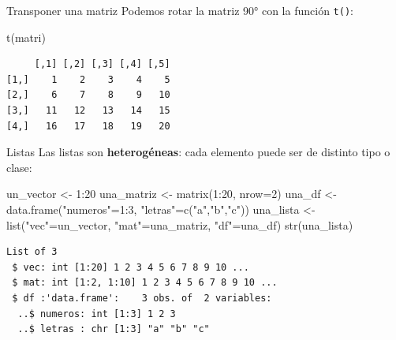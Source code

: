 \documentclass[
  9pt,
  ignorenonframetext,
]{beamer}
\newenvironment{Shaded}{\begin{snugshade}}{\end{snugshade}}
\newcommand{\AttributeTok}[1]{\textcolor[rgb]{0.40,0.45,0.13}{#1}}
\newcommand{\DecValTok}[1]{\textcolor[rgb]{0.68,0.00,0.00}{#1}}
\newcommand{\FunctionTok}[1]{\textcolor[rgb]{0.28,0.35,0.67}{#1}}
\newcommand{\NormalTok}[1]{\textcolor[rgb]{0.00,0.23,0.31}{#1}}
\newcommand{\OtherTok}[1]{\textcolor[rgb]{0.00,0.23,0.31}{#1}}
\newcommand{\SpecialCharTok}[1]{\textcolor[rgb]{0.37,0.37,0.37}{#1}}
\newcommand{\StringTok}[1]{\textcolor[rgb]{0.13,0.47,0.30}{#1}}
\begin{document}
\begin{frame}[fragile]{Transponer una matriz}
\label{transponer-una-matriz}
Podemos rotar la matriz 90° con la función \texttt{t()}:

\begin{Shaded}
\begin{Highlighting}[]
\FunctionTok{t}\NormalTok{(matri)}
\end{Highlighting}
\end{Shaded}

\begin{verbatim}
     [,1] [,2] [,3] [,4] [,5]
[1,]    1    2    3    4    5
[2,]    6    7    8    9   10
[3,]   11   12   13   14   15
[4,]   16   17   18   19   20
\end{verbatim}
\end{frame}

\begin{frame}[fragile]{Listas}
\label{listas}
Las listas son \textbf{heterogéneas}: cada elemento puede ser de
distinto tipo o clase:

\begin{Shaded}
\begin{Highlighting}[]
\NormalTok{un\_vector }\OtherTok{\textless{}{-}} \DecValTok{1}\SpecialCharTok{:}\DecValTok{20}
\NormalTok{una\_matriz }\OtherTok{\textless{}{-}} \FunctionTok{matrix}\NormalTok{(}\DecValTok{1}\SpecialCharTok{:}\DecValTok{20}\NormalTok{, }\AttributeTok{nrow=}\DecValTok{2}\NormalTok{)}
\NormalTok{una\_df }\OtherTok{\textless{}{-}} \FunctionTok{data.frame}\NormalTok{(}\StringTok{"numeros"}\OtherTok{=}\DecValTok{1}\SpecialCharTok{:}\DecValTok{3}\NormalTok{, }\StringTok{"letras"}\OtherTok{=}\FunctionTok{c}\NormalTok{(}\StringTok{"a"}\NormalTok{,}\StringTok{"b"}\NormalTok{,}\StringTok{"c"}\NormalTok{))}
\NormalTok{una\_lista }\OtherTok{\textless{}{-}} \FunctionTok{list}\NormalTok{(}\StringTok{"vec"}\OtherTok{=}\NormalTok{un\_vector, }\StringTok{"mat"}\OtherTok{=}\NormalTok{una\_matriz, }\StringTok{"df"}\OtherTok{=}\NormalTok{una\_df)}
\FunctionTok{str}\NormalTok{(una\_lista)}
\end{Highlighting}
\end{Shaded}

\begin{verbatim}
List of 3
 $ vec: int [1:20] 1 2 3 4 5 6 7 8 9 10 ...
 $ mat: int [1:2, 1:10] 1 2 3 4 5 6 7 8 9 10 ...
 $ df :'data.frame':    3 obs. of  2 variables:
  ..$ numeros: int [1:3] 1 2 3
  ..$ letras : chr [1:3] "a" "b" "c"
\end{verbatim}
\end{frame}
\end{document}
